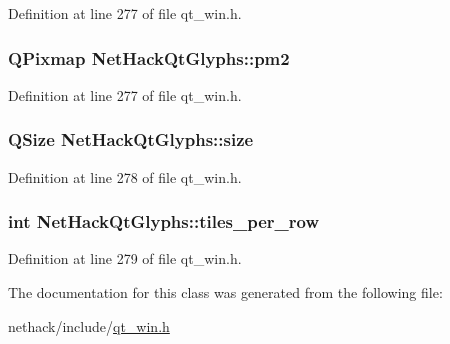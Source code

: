 Definition at line 277 of file qt\+\_\+win.\+h.

\hypertarget{classNetHackQtGlyphs_a5f7ec5a187648043433f326065c710ca}{
\subsubsection[{pm2}]{\setlength{\rightskip}{0pt plus 5cm}Q\+Pixmap Net\+Hack\+Qt\+Glyphs\+::pm2\hspace{0.3cm}{\ttfamily [private]}}}\label{classNetHackQtGlyphs_a5f7ec5a187648043433f326065c710ca}


Definition at line 277 of file qt\+\_\+win.\+h.

\hypertarget{classNetHackQtGlyphs_a8128893ac46751b7a00c4635b585d677}{
\subsubsection[{size}]{\setlength{\rightskip}{0pt plus 5cm}Q\+Size Net\+Hack\+Qt\+Glyphs\+::size\hspace{0.3cm}{\ttfamily [private]}}}\label{classNetHackQtGlyphs_a8128893ac46751b7a00c4635b585d677}


Definition at line 278 of file qt\+\_\+win.\+h.

\hypertarget{classNetHackQtGlyphs_a32a0428bbf038bae5135d20e0fbca31d}{
\subsubsection[{tiles\+\_\+per\+\_\+row}]{\setlength{\rightskip}{0pt plus 5cm}int Net\+Hack\+Qt\+Glyphs\+::tiles\+\_\+per\+\_\+row\hspace{0.3cm}{\ttfamily [private]}}}\label{classNetHackQtGlyphs_a32a0428bbf038bae5135d20e0fbca31d}


Definition at line 279 of file qt\+\_\+win.\+h.



The documentation for this class was generated from the following file\+:\begin{DoxyCompactItemize}
\item 
nethack/include/\hyperlink{qt__win_8h}{qt\+\_\+win.\+h}\end{DoxyCompactItemize}
